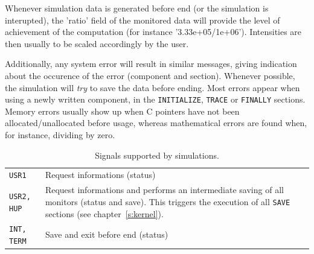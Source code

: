 Whenever simulation data is generated before end (or the simulation is
interupted), the 'ratio' field of the monitored data will provide the
level of achievement of the computation (for instance
'3.33e+05/1e+06'). Intensities are then usually to be scaled
accordingly by the user.

Additionally, any system error will result in similar messages, giving
indication about the occurence of the error (component and
section). Whenever possible, the simulation will {\em try} to save the
data before ending. Most errors appear when using a newly written component, in the \texttt{INITIALIZE}, \texttt{TRACE} or \texttt{FINALLY} sections. Memory errors usually show up when C pointers have not been allocated/unallocated before usage, whereas mathematical errors are found when, for instance, dividing by zero.

\begin{table}
  \begin{center}
    {\let\my=\\
    \begin{tabular}{|p{}|p{}|}
      \hline
      \texttt{USR1} & Request informations (status)  \\
      \texttt{USR2, HUP} & Request informations and performs an intermediate saving of all monitors (status and save). This triggers the execution of all \texttt{SAVE} sections (see chapter~\ref{s:kernel}).  \\
      \texttt{INT, TERM} & Save and exit before end (status)  \\
      \hline
    \end{tabular}
    \caption{Signals supported by \MCX simulations.}
    \label{t:signals}
    }
  \end{center}
\end{table}


